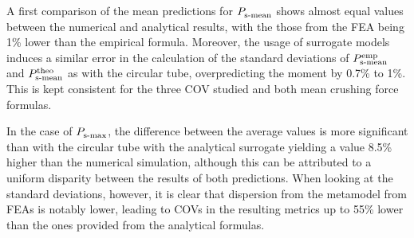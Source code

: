 \documentclass[12pt,number,preprint,review,times]{elsarticle}
\begin{document}
A first comparison of the mean predictions for $P^{\mathrm{}}_{\mathrm{s{\text -}mean}}$ shows almost equal values between the numerical and analytical results, with the those from the FEA being 1\% lower than the empirical formula. Moreover, the usage of surrogate models induces a similar error in the calculation of the standard deviations of $P^{\mathrm{emp}}_{\mathrm{s{\text -}mean}}$ and  $P^{\mathrm{theo}}_{\mathrm{s{\text -}mean}}$ as with the circular tube, overpredicting the moment by 0.7\% to 1\%. This is kept consistent for the three COV studied and both mean crushing force formulas.

In the case of $P^{\mathrm{}}_{\mathrm{s{\text -}max}}$, the difference between the average values is more significant than with the circular tube with the analytical surrogate yielding a value 8.5\% higher than the numerical simulation, although this can be attributed to a uniform disparity between the results of both predictions. When looking at the standard deviations, however, it is clear that dispersion from the metamodel from FEAs is notably lower, leading to COVs in the resulting metrics up to 55\% lower than the ones provided from the analytical formulas. 

\end{document}
